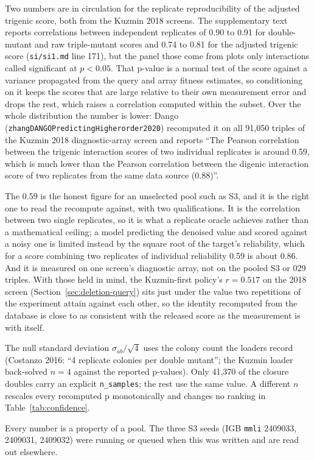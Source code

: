 Two numbers are in circulation for the replicate reproducibility of the adjusted
trigenic score, both from the Kuzmin 2018 screens. The supplementary text reports
correlations between independent replicates of 0.90 to 0.91 for double-mutant and raw
triple-mutant scores and 0.74 to 0.81 for the adjusted trigenic score
(\texttt{si/si1.md} line 171), but the panel those come from plots only interactions
called significant at $p < 0.05$. That p-value is a normal test of the score against a
variance propagated from the query and array fitness estimates, so conditioning on it
keeps the scores that are large relative to their own measurement error and drops the
rest, which raises a correlation computed within the subset. Over the whole
distribution the number is lower: Dango (\texttt{zhangDANGOPredictingHigherorder2020})
recomputed it on all 91{,}050 triples of the Kuzmin 2018 diagnostic-array screen and
reports ``The Pearson correlation between the trigenic interaction scores of two
individual replicates is around 0.59, which is much lower than the Pearson correlation
between the digenic interaction score of two replicates from the same data source
(0.88)''.

The 0.59 is the honest figure for an unselected pool such as S3, and it is the right
one to read the recompute against, with two qualifications. It is the correlation
between two single replicates, so it is what a replicate oracle achieves rather than a
mathematical ceiling; a model predicting the denoised value and scored against a noisy
one is limited instead by the square root of the target's reliability, which for a
score combining two replicates of individual reliability 0.59 is about 0.86. And it is
measured on one screen's diagnostic array, not on the pooled S3 or 029 triples. With
those held in mind, the Kuzmin-first policy's $r = 0.517$ on the 2018 screen
(Section~\ref{sec:deletion-query}) sits just under the value two repetitions of the
experiment attain against each other, so the identity recomputed from the database is
close to as consistent with the released score as the measurement is with itself.

The null standard deviation $\sigma_{ab}/\sqrt{4}$ uses the colony count the loaders
record (Costanzo 2016: ``4 replicate colonies per double mutant''; the Kuzmin loader
back-solved $n = 4$ against the reported p-values). Only 41{,}370 of the closure
doubles carry an explicit \texttt{n\_samples}; the rest use the same value. A
different $n$ rescales every recomputed p monotonically and changes no ranking in
Table~\ref{tab:confidence}.

Every number is a property of a pool. The three S3 seeds
(IGB \texttt{mmli} 2409033, 2409031, 2409032) were running or queued when this was
written and are read out elsewhere.
